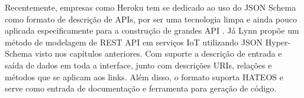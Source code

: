 Recentemente, empresas como Heroku tem se dedicado ao uso do JSON Schema como formato de descrição de APIs, por ser uma tecnologia limpa e ainda pouco aplicada especificamente para a construção de grandes API \cite{Leach2014}. Já Lynn propõe um método de modelagem de REST API em serviços IoT utilizando JSON Hyper-Schema visto nos capítulos anteriores. Com suporte a descrição de entrada e saída de dados em toda a interface, junto com descrições URIs, relações e métodos que se aplicam aos links. Além disso, o formato suporta HATEOS e serve como entrada de documentação e ferramenta para geração de código. \cite{LynnEtAl2016}
